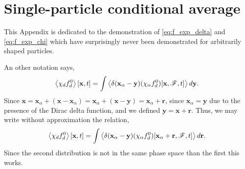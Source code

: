 \section{Single-particle conditional average}
\label{ap:conditional_avg}

This Appendix is dedicated to the demonstration of \ref{eq:f_exp_delta} and \ref{eq:f_exp_chi} which have surprisingly never been demonstrated for arbitrarily shaped particles.


An other notation says, 
\begin{align}
    \left<\chi_d f_d^0\right>[\textbf{x},t]
    =
    \int 
    \left<
        \delta(\textbf{x}_\alpha - \textbf{y})
        (\chi_\alpha
        f_d^0)[\textbf{x},\mathscr{F},t]
    \right>
     d\textbf{y}. 
\end{align}
Since  $\textbf{x} = \textbf{x}_\alpha + (\textbf{x} - \textbf{x}_\alpha) = \textbf{x}_\alpha + (\textbf{x} - \textbf{y}) = \textbf{x}_\alpha + \textbf{r} $, since $\textbf{x}_\alpha = \textbf{y}$ due to the presence of the Dirac delta function,  and we defined $\textbf{y} = \textbf{x}+\textbf{r}$. 
Thus, we may write without approximation the relation, 
\begin{align}
    \left<\chi_d f_d^0\right>[\textbf{x},t]
    =
    \int 
    \left<
        \delta(\textbf{x}_\alpha - \textbf{y})
        (\chi_\alpha
        f_d^0)[\textbf{x}_\alpha + \textbf{r},\mathscr{F},t]
    \right>
     d\textbf{r}. 
\end{align}
Since the second distribution is not in the same phase space than the first this works. 

